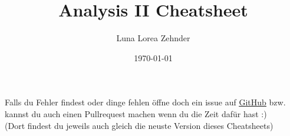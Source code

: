 \documentclass[8pt]{article}
\title{Analysis II Cheatsheet}
\author{Luna Lorea Zehnder}
\date{\today}
\begin{document}
\begin{multicols*}{3}
  \maketitle %
  Falls du Fehler findest oder dinge fehlen öffne doch ein issue auf \color{Maroon4}\href{https://github.com/LunaLorea/Analysis-II-Cheatsheet}{\underline{GitHub}}\color{defaultcolor}  \;bzw. kannst du auch einen Pullrequest machen wenn du die Zeit dafür hast :)\\
  (Dort findest du jeweils auch gleich die neuste Version dieses Cheatsheets)
  
  
\end{multicols*}
\end{document}
